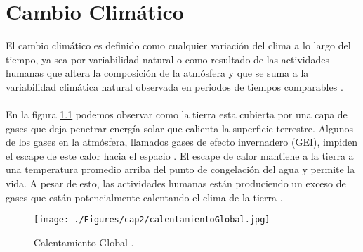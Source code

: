 \newpage{\ } 
\thispagestyle{empty} 

\chapter{Cambio Clim\'atico}


El cambio clim\'atico es definido como cualquier variaci\'on del clima a lo largo del tiempo, ya sea por variabilidad natural o como resultado de las actividades humanas que altera la composici\'on de la atm\'osfera y que se suma a la variabilidad clim\'atica natural observada en periodos de tiempos comparables \cite{robert2002captura}.\\~\\
En la figura \ref{fig:cambioClimatico} podemos observar como la tierra esta cubierta por una capa de gases que deja penetrar energ\'ia solar que calienta la superficie terrestre. Algunos de los gases en la atm\'osfera, llamados gases de efecto invernadero (GEI), impiden el escape de este calor hacia el espacio . El escape de calor  mantiene a la tierra a una temperatura promedio arriba del punto de congelaci\'on del agua y permite la vida. A pesar de esto, las actividades humanas est\'an produciendo un exceso de gases que est\'an potencialmente calentando el clima de la tierra \cite{almando2014estimacion}.
    \begin{figure}[!hbtp]
    	\centering
    	\texttt{[image: ./Figures/cap2/calentamientoGlobal.jpg]}
    	\caption{Calentamiento Global \cite{calent2015global}.}
    	\label{fig:cambioClimatico}
    \end{figure}


